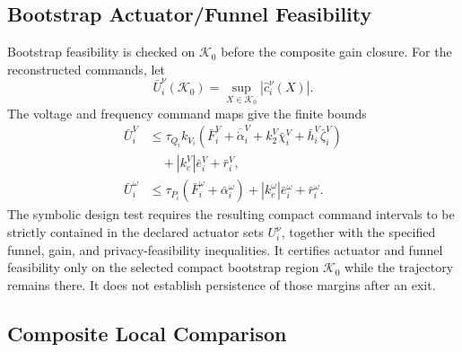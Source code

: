 \documentclass[journal]{IEEEtran}
\begin{document}
\subsection{Bootstrap Actuator/Funnel Feasibility}

Bootstrap feasibility is checked on $\mathcal K_0$ before the composite gain
closure. For the reconstructed commands, let
\begin{equation}
\bar U_i^\nu(\mathcal K_0)
=\sup_{X\in\mathcal K_0}|\widehat c_i^\nu(X)|.
\label{eq:local_actuator_demand}
\end{equation}
The voltage and frequency command maps give the finite bounds
\begin{align}
\bar U_i^V
&\leq\tau_{Q_i}k_{V_i}
(\bar F_i^V+\overline{\dot\alpha}_i^V
+k_2^V\bar\chi_i^V+\bar h_i^V\bar\zeta_i^V)
\nonumber\\
&\quad+|k_c^V|\bar e_i^V+\bar r_i^V,
\label{eq:voltage_actuator_bound}\\
\bar U_i^\omega
&\leq\tau_{P_i}(\bar F_i^\omega+\bar\alpha_i^\omega)
+|k_c^\omega|\bar e_i^\omega+\bar r_i^\omega.
\label{eq:frequency_actuator_bound}
\end{align}
The symbolic design test requires the resulting compact command intervals to be
strictly contained in the declared actuator sets $U_i^\nu$, together with the
specified funnel, gain, and privacy-feasibility inequalities. It certifies
actuator and funnel feasibility only on the selected compact bootstrap region
$\mathcal K_0$ while the trajectory remains there. It does not establish
persistence of those margins after an exit.

\subsection{Composite Local Comparison}
\end{document}
